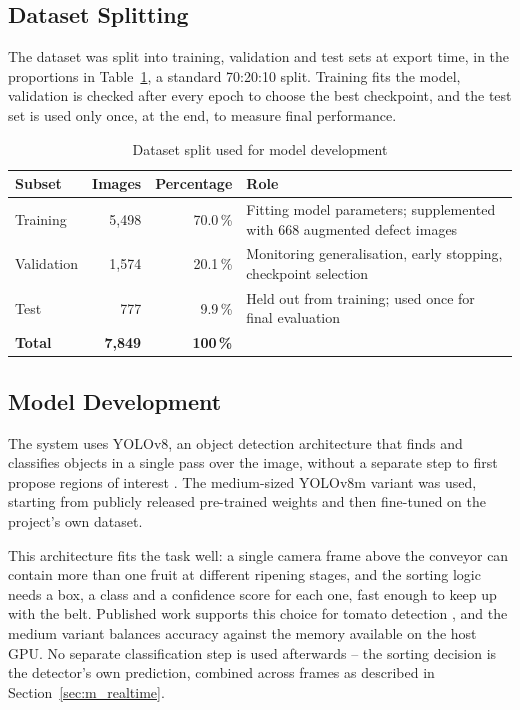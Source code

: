 \subsection{Dataset Splitting}
\label{sec:m_splitting}

The dataset was split into training, validation and test sets at export time, in the proportions in Table~\ref{tab:split}, a standard 70:20:10 split. Training fits the model, validation is checked after every epoch to choose the best checkpoint, and the test set is used only once, at the end, to measure final performance.

\begin{table}[H]
\caption{Dataset split used for model development}
\label{tab:split}
\centering
\begin{tabularx}{\textwidth}{l r r X}
\toprule
\textbf{Subset} & \textbf{Images} & \textbf{Percentage} & \textbf{Role} \\
\midrule
Training   & 5{,}498 & 70.0\,\% & Fitting model parameters; supplemented with 668 augmented defect images \\
Validation & 1{,}574 & 20.1\,\% & Monitoring generalisation, early stopping, checkpoint selection \\
Test       & 777   & 9.9\,\%  & Held out from training; used once for final evaluation \\
\midrule
\textbf{Total} & \textbf{7{,}849} & \textbf{100\,\%} & \\
\bottomrule
\end{tabularx}
\end{table}

\subsection{Model Development}
\label{sec:m_model}

The system uses YOLOv8, an object detection architecture that finds and classifies objects in a single pass over the image, without a separate step to first propose regions of interest \citep{redmon2016, terven2023}. The medium-sized YOLOv8m variant was used, starting from publicly released pre-trained weights and then fine-tuned on the project's own dataset.

This architecture fits the task well: a single camera frame above the conveyor can contain more than one fruit at different ripening stages, and the sorting logic needs a box, a class and a confidence score for each one, fast enough to keep up with the belt. Published work supports this choice for tomato detection \citep{safira2026}, and the medium variant balances accuracy against the memory available on the host \acrshort{GPU}. No separate classification step is used afterwards -- the sorting decision is the detector's own prediction, combined across frames as described in Section~\ref{sec:m_realtime}.

